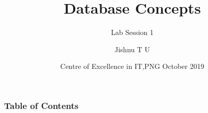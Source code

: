 \documentclass[hyperref={bookmarks=false},aspectratio=169]{beamer}
\title[PPT Title]
{\bfseries{Database Concepts}}
\subtitle{Lab Session 1}
\author[Jishnu T U] %
{Jishnu T U\inst{1} } %
\institute[CEIT]
{
  \inst{1}
  Trainer\\
  Centre of Excellence in IT,PNG
}
\date[CEIT, 2014]
{Centre of Excellence in IT,PNG October 2019}
\begin{document}
\frame{\titlepage}  %

\begin{frame}
\frametitle{Table of Contents}
\tableofcontents
\end{frame}


%









\end{document}
